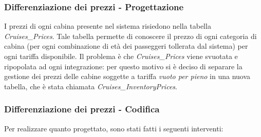 \subsubsection{Differenziazione dei prezzi - Progettazione}
I prezzi di ogni cabina presente nel sistema risiedono nella tabella \textit{Cruises\_Prices}. Tale tabella permette di conoscere il prezzo di ogni categoria di cabina (per ogni combinazione di età dei passeggeri tollerata dal sistema) per ogni \gls{tariffa} disponibile. Il problema è che \textit{Cruises\_Prices} viene svuotata e ripopolata ad ogni integrazione: per questo motivo si è deciso di separare la gestione dei prezzi delle cabine soggette a tariffa \textit{vuoto per pieno} in una nuova tabella, che è stata chiamata \textit{Cruises\_InventoryPrices}. 
\subsubsection{Differenziazione dei prezzi - Codifica}
Per realizzare quanto progettato, sono stati fatti i seguenti interventi:
